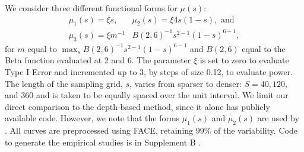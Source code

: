 \documentclass[12pt]{article}
\theoremstyle{plain}
\theoremstyle{remark}
\begin{document}
	
	
	
	We consider three different functional forms for $\mu(s)$: 
	\begin{align*}
		\mu_1(s) = \xi s,\ &\mu_2(s) = \xi4s(1-s), \text{ and}\\
		\mu_3(s) = \xi m^{-1} &B(2, 6)^{-1} s^{2-1} (1-s)^{6-1},
	\end{align*}
	for $m$ equal to $\max_s B(2, 6)^{-1} s^{2-1}(1-s)^{6-1}$ and $B(2,6)$ equal to the Beta function evaluated at 2 and 6. The parameter $\xi$ is set to zero to evaluate Type I Error and incremented up to 3, by steps of size 0.12, to evaluate power. The length of the sampling grid, $s$, varies from sparser to denser: $S = 40, 120,$ and 360 and is taken to be equally spaced over the unit interval. We limit our direct comparison to the depth-based method, since it alone has publicly available code. However, we note that the forms $\mu_1(s)$ and $\mu_2(s)$ are used by \cite{Chak2015}. All curves are preprocessed using FACE, retaining 99\% of the variability. Code to generate the empirical studies is in Supplement B \citep{DRTSup2024B}.
\end{document}
